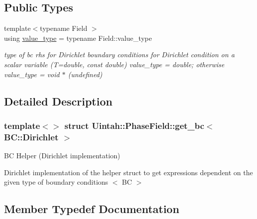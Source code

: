 \subsection*{Public Types}
\begin{DoxyCompactItemize}
\item 
{\footnotesize template$<$typename Field $>$ }\\using \hyperlink{structUintah_1_1PhaseField_1_1get__bc_3_01BC_1_1Dirichlet_01_4_ae1c15db2b127eed1a3216daeda3a338c}{value\+\_\+type} = typename Field\+::value\+\_\+type
\begin{DoxyCompactList}\small\item\em type of bc rhs for Dirichlet boundary conditions for Dirichlet condition on a scalar variable (T=double, const double) value\+\_\+type = double; otherwise value\+\_\+type = void $\ast$ (undefined) \end{DoxyCompactList}\end{DoxyCompactItemize}


\subsection{Detailed Description}
\subsubsection*{template$<$$>$\newline
struct Uintah\+::\+Phase\+Field\+::get\+\_\+bc$<$ B\+C\+::\+Dirichlet $>$}

BC Helper (Dirichlet implementation) 

Dirichlet implementation of the helper struct to get expressions dependent on the given type of boundary conditions $<$ BC $>$ 

\subsection{Member Typedef Documentation}
\mbox{\label{structUintah_1_1PhaseField_1_1get__bc_3_01BC_1_1Dirichlet_01_4_ae1c15db2b127eed1a3216daeda3a338c}} 
